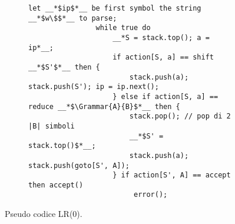 \documentclass{subfiles}
\begin{document}
\begin{figure}[h!]
    \centering
    \begin{subfigure}[b]{0.7\textwidth}
        \begin{lstlisting}[language = PSEUDO]
                let __*$ip$*__ be first symbol the string __*$w\$$*__ to parse;
                while true do 
                    __*S = stack.top(); a = ip*__;
                    if action[S, a] == shift __*$S'$*__ then {
                        stack.push(a); stack.push(S'); ip = ip.next();
                    } else if action[S, a] == reduce __*$\Grammar{A}{B}$*__ then {
                        stack.pop(); // pop di 2 |B| simboli
                        __*$S' = stack.top()$*__;
                        stack.push(a); stack.push(goto[S', A]);
                    } if action[S', A] == accept then accept()
                         error();
            \end{lstlisting}
    \end{subfigure}
    \caption{Pseudo codice LR(0).}
    \label{fig:7}
\end{figure}
\end{document}
